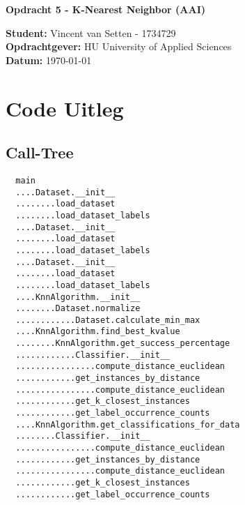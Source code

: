 \documentclass[a4paper]{report}
\begin{document}
\begin{titlepage}
    \begin{center}
        \vspace*{.9cm}
        \Huge
        \textbf{ Opdracht 5 - K-Nearest Neighbor (AAI)}\\
        \vspace{0.2cm}




        \vfill
      \end{center}
        \textbf{Student:} Vincent van Setten - 1734729 \\
        \textbf{Opdrachtgever:} HU University of Applied Sciences\\
        \textbf{Datum:} \today \\
        \vspace{2cm}
\end{titlepage}


\tableofcontents


\clearpage  %

\chapter{Code Uitleg}
\section{Call-Tree}
\begin{verbatim}
  main
  ....Dataset.__init__
  ........load_dataset
  ........load_dataset_labels
  ....Dataset.__init__
  ........load_dataset
  ........load_dataset_labels
  ....Dataset.__init__
  ........load_dataset
  ........load_dataset_labels
  ....KnnAlgorithm.__init__
  ........Dataset.normalize
  ............Dataset.calculate_min_max
  ....KnnAlgorithm.find_best_kvalue
  ........KnnAlgorithm.get_success_percentage
  ............Classifier.__init__
  ................compute_distance_euclidean
  ............get_instances_by_distance
  ................compute_distance_euclidean
  ............get_k_closest_instances
  ............get_label_occurrence_counts
  ....KnnAlgorithm.get_classifications_for_data
  ........Classifier.__init__
  ................compute_distance_euclidean
  ............get_instances_by_distance
  ................compute_distance_euclidean
  ............get_k_closest_instances
  ............get_label_occurrence_counts
  \end{verbatim}
\end{document}
